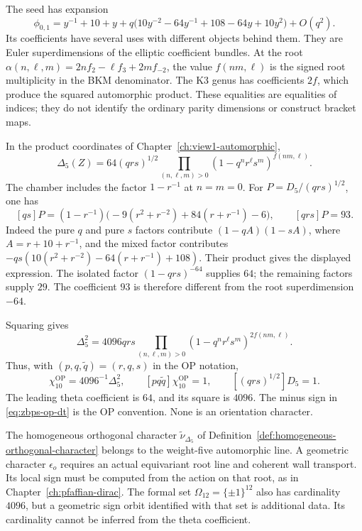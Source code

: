 The seed has expansion
\begin{equation}\label{eq:zbps-phi01-leading}
 \phi_{0,1}=y^{-1}+10+y
 +q\bigl(10y^{-2}-64y^{-1}+108-64y+10y^2\bigr)+O(q^2).
\end{equation}
Its coefficients have several uses with different objects behind
them.  They are Euler superdimensions of the elliptic coefficient
bundles.  At the root
\(\alpha(n,\ell,m)=2nf_2-\ell f_3+2mf_{-2}\), the value
\(f(nm,\ell)\) is the signed root multiplicity in the BKM
denominator.  The K3 genus has coefficients \(2f\),
which produce the squared automorphic product.  These equalities
are equalities of indices; they do not identify the ordinary
parity dimensions or construct bracket maps.

In the product coordinates of Chapter~\ref{ch:view1-automorphic},
\begin{equation}\label{eq:zbps-bgn-product}
 \Delta_5(Z)=64(qrs)^{1/2}
       \prod_{(n,\ell,m)>0}(1-q^nr^\ell s^m)^{f(nm,\ell)}.
\end{equation}
The chamber includes the factor \(1-r^{-1}\) at \(n=m=0\).
For \(P=D_5/(qrs)^{1/2}\), one has
\[
 [qs]P=(1-r^{-1})
       \bigl(-9(r^2+r^{-2})+84(r+r^{-1})-6\bigr),
 \qquad [qrs]P=93.
\]
Indeed the pure \(q\) and pure \(s\) factors contribute
\((1-qA)(1-sA)\), where \(A=r+10+r^{-1}\), and the mixed
factor contributes
\(-qs(10(r^2+r^{-2})-64(r+r^{-1})+108)\).
Their product gives the displayed expression.
The isolated factor \((1-qrs)^{-64}\) supplies \(64\); the
remaining factors supply \(29\).  The coefficient \(93\) is
therefore different from the root superdimension \(-64\).

Squaring gives
\begin{equation}\label{eq:zbps-delta5-squared-leading}
 \Delta_5^2=4096qrs
       \prod_{(n,\ell,m)>0}(1-q^nr^\ell s^m)^{2f(nm,\ell)}.
\end{equation}
Thus, with \((p,q,\widetilde q)=(r,q,s)\) in the OP notation,
\begin{equation}\label{eq:zbps-leading-coeff-check}
 \chi_{10}^{\mathrm{OP}}=4096^{-1}\Delta_5^2,
 \qquad [pq\widetilde q]\chi_{10}^{\mathrm{OP}}=1,
 \qquad [(qrs)^{1/2}]D_5=1.
\end{equation}
The leading theta coefficient is \(64\), and its square is
\(4096\).  The minus sign in \eqref{eq:zbps-op-dt} is the OP
convention.  None is an orientation character.

\begin{remark}
\label{rem:zbps-constants-not-orientation}
The homogeneous orthogonal character
\(\widetilde\nu_{\Delta_5}\) of
Definition~\ref{def:homogeneous-orthogonal-character} belongs to
the weight-five automorphic line.  A geometric character
\(\epsilon_o\) requires an actual equivariant root line and
coherent wall transport.  Its local sign must be computed from
the action on that root, as in Chapter~\ref{ch:pfaffian-dirac}.
The formal set \(\Omega_{12}=\{\pm1\}^{12}\) also has
cardinality \(4096\), but a geometric sign orbit identified
with that set is additional data.  Its cardinality cannot be
inferred from the theta coefficient.
\end{remark}

